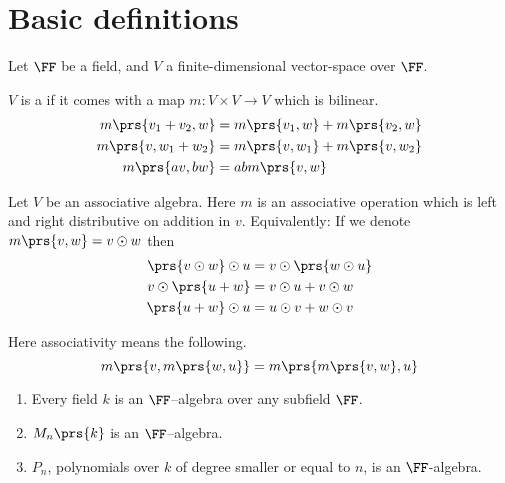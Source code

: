 \documentclass[10pt,a4paper,twoside,openany,hidelinks]{book}
\begin{document}
\section{Basic definitions}

Let $\FF$ be a field, and $V$ a finite-dimensional vector-space over $\FF$.

\begin{definition}
$V$ is a  if it comes with a map $m \colon V \times V \to V$ which is bilinear.
\begin{align*}
m\prs{v_1 + v_2, w} &= m\prs{v_1, w} + m\prs{v_2, w} \\
m\prs{v, w_1 + w_2} &= m\prs{v, w_1} + m\prs{v, w_2} \\
m\prs{av, bw} &= abm\prs{v,w}
\end{align*} 
\end{definition}
\begin{example}
Let $V$ be an associative algebra.
Here $m$ is an associative operation which is left and right distributive on addition in $v$.
Equivalently: If we denote $m\prs{v,w} = v \odot w$ then
\begin{align*}
\prs{v \odot w} \odot u &= v \odot \prs{w \odot u} \\
v \odot \prs{u+w} &= v\odot u + v\odot w \\
\prs{u+w}\odot u &= u\odot v + w\odot v
\end{align*}
\end{example}
\begin{remark}
Here associativity means the following.
\[m\prs{v, m\prs{w,u}} = m\prs{m\prs{v,w},u}\]
\end{remark}
\begin{examples}
\begin{enumerate}
\item Every field $k$ is an $\FF$–algebra over any subfield $\FF$.

\item $M_n\prs{k}$ is an $\FF$–algebra.

\item $P_n$, polynomials over $k$ of degree smaller or equal to $n$, is an $\FF$-algebra.
\end{enumerate}
\end{examples}
\end{document}
